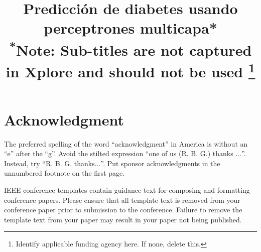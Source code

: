 \documentclass[conference,compsoc]{IEEEtran}
\begin{document}
\title{Predicción de diabetes usando perceptrones multicapa*\\
{\footnotesize \textsuperscript{*}Note: Sub-titles are not captured in Xplore and
should not be used}
\thanks{Identify applicable funding agency here. If none, delete this.}
}



\maketitle















\section*{Acknowledgment}

The preferred spelling of the word ``acknowledgment'' in America is without 
an ``e'' after the ``g''. Avoid the stilted expression ``one of us (R. B. 
G.) thanks $\ldots$''. Instead, try ``R. B. G. thanks$\ldots$''. Put sponsor 
acknowledgments in the unnumbered footnote on the first page.



\vspace{12pt}
\color{red}
IEEE conference templates contain guidance text for composing and formatting conference papers. Please ensure that all template text is removed from your conference paper prior to submission to the conference. Failure to remove the template text from your paper may result in your paper not being published.
\end{document}
